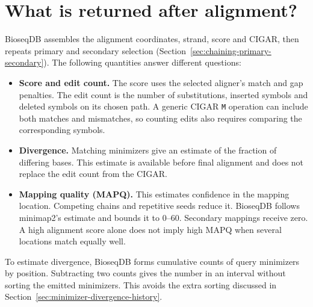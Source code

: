 \section{What is returned after alignment?}
\label{sec:alignment-postprocessing}

BioseqDB assembles the alignment coordinates, strand, score and CIGAR, then
repeats primary and secondary selection
(Section~\ref{sec:chaining-primary-secondary}). The following quantities
answer different questions:
\begin{itemize}
  \item \textbf{Score and edit count.} The score uses the selected aligner's
    match and gap penalties. The edit count is the number of substitutions,
    inserted symbols and deleted symbols on its chosen path. A generic
    CIGAR \texttt{M} operation can include both matches and mismatches, so
    counting edits also requires comparing the corresponding symbols.
  \item \textbf{Divergence.} Matching minimizers give an estimate of the
    fraction of differing bases. This estimate is available before final
    alignment and does not replace the edit count from the CIGAR.
  \item \textbf{Mapping quality (MAPQ).} This estimates confidence in the
    mapping location. Competing chains and repetitive seeds reduce it.
    BioseqDB follows minimap2's estimate and bounds it to 0--60.
    Secondary mappings receive zero. A high alignment score alone does not
    imply high MAPQ when several locations match equally well.
\end{itemize}

\noindent\label{sec:divergence-prefix-counts}
To estimate divergence, BioseqDB forms cumulative counts of query minimizers
by position. Subtracting two counts gives the number in an interval without
sorting the emitted minimizers. This avoids the extra sorting discussed in
Section~\ref{sec:minimizer-divergence-history}.
